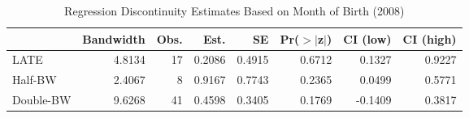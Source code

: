 \begin{table}[ht]
\centering
\begin{tabular}{lrrrrrrr}
  \hline
 & Bandwidth & Obs. & Est. & SE & Pr($>$$|$z$|$) & CI (low) & CI (high) \\ 
  \hline
LATE & 4.8134 & 17 & 0.2086 & 0.4915 & 0.6712 & 0.1327 & 0.9227 \\ 
  Half-BW & 2.4067 & 8 & 0.9167 & 0.7743 & 0.2365 & 0.0499 & 0.5771 \\ 
  Double-BW & 9.6268 & 41 & 0.4598 & 0.3405 & 0.1769 & -0.1409 & 0.3817 \\ 
   \hline
\end{tabular}
\caption{Regression Discontinuity Estimates Based on Month of Birth (2008)} 
\label{tab:rd2008m1}
\end{table}
